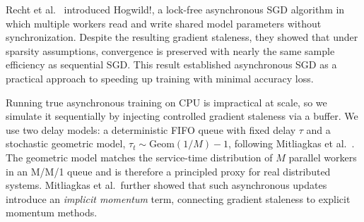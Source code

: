 \documentclass[10pt,conference,compsocconf]{IEEEtran}
\begin{document}


Recht et al.~\cite{recht2011hogwild} introduced Hogwild!, a lock-free asynchronous SGD
algorithm in which multiple workers read and write shared model parameters without
synchronization. Despite the resulting gradient staleness, they showed that under
sparsity assumptions, convergence is preserved with nearly the same sample efficiency
as sequential SGD. This result established asynchronous SGD as a practical approach to
speeding up training with minimal accuracy loss.

Running true asynchronous training on CPU is impractical at scale, so we simulate it
sequentially by injecting controlled gradient staleness via a buffer. We use two delay
models: a deterministic FIFO queue with fixed delay $\tau$ and a stochastic geometric
model, $\tau_t \sim \mathrm{Geom}(1/M) - 1$, following Mitliagkas et al.~\cite{mitliagkas2014async}.
The geometric model matches the service-time distribution of $M$ parallel workers in an
M/M/1 queue and is therefore a principled proxy for real distributed systems.
Mitliagkas et al.\ further showed that such asynchronous updates introduce an
\emph{implicit momentum} term, connecting gradient staleness to explicit momentum methods.
\end{document}
